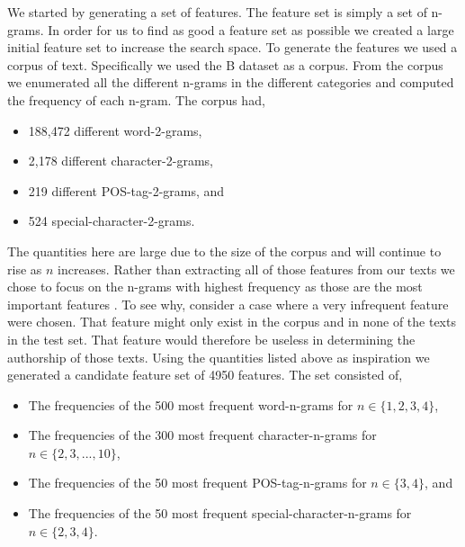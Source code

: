 We started by generating a set of features. The feature set is simply a set of
n-grams. In order for us to find as good a feature set as possible we created
a large initial feature set to increase the search space. To generate the
features we used a corpus of text. Specifically we used the \gls{B} dataset as a
corpus. From the corpus we enumerated all the different n-grams in the different
categories and computed the frequency of each n-gram. The corpus had,

\begin{itemize}
    \item 188,472 different word-2-grams,
    \item 2,178 different character-2-grams,
    \item 219 different \gls{POS}-tag-2-grams, and
    \item 524 special-character-2-grams.
\end{itemize}

The quantities here are large due to the size of the corpus and will continue
to rise as $n$ increases. Rather than extracting all of those features from
our texts we chose to focus on the n-grams with highest frequency as those are
the most important features \citep{stamatos2009}. To see why, consider a case
where a very infrequent feature were chosen. That feature might only exist
in the corpus and in none of the texts in the test set. That feature would
therefore be useless in determining the authorship of those texts. Using the
quantities listed above as inspiration we generated a candidate feature set of
4950 features. The set consisted of,

\begin{itemize}

    \item

        The frequencies of the 500 most frequent word-n-grams for $n \in \{1, 2,
        3, 4\}$,

    \item

        The frequencies of the 300 most frequent character-n-grams for $n \in
        \{2, 3, ..., 10\}$,

    \item

        The frequencies of the 50 most frequent \gls{POS}-tag-n-grams for $n \in
        \{3, 4\}$, and

    \item

        The frequencies of the 50 most frequent special-character-n-grams for $n
        \in \{2, 3, 4\}$.

\end{itemize}

